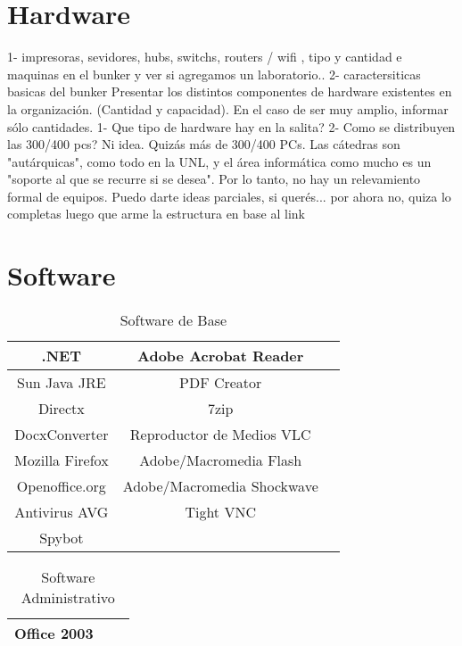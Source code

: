 \documentclass[10pt,a4paper,final]{article}
\begin{document}
\section{Hardware}
1- impresoras, sevidores, hubs, switchs, routers / wifi , tipo y cantidad e maquinas en el bunker y ver si agregamos un laboratorio..
2- caractersiticas basicas del bunker
Presentar los distintos componentes de hardware existentes en la organización. (Cantidad y capacidad).
En el caso de ser muy amplio, informar sólo cantidades.
1- Que tipo de hardware hay en la salita?
2- Como se distribuyen las 300/400 pcs?
Ni idea. Quizás más de 300/400 PCs. Las cátedras son "autárquicas", como todo en la UNL, y el área informática como mucho es un "soporte al que se recurre si se desea". Por lo tanto, no hay un relevamiento formal de equipos.
Puedo darte ideas parciales, si querés...
por ahora no, quiza lo completas luego que arme la estructura en base al link

\section{Software}

\begin{table}
\caption{Software de Base}
\begin{center}\begin{tabular}{ccc}
\hline .NET & Adobe Acrobat Reader\\
\hline Sun Java JRE & PDF Creator\\
\hline Directx & 7zip\\
\hline DocxConverter & Reproductor de Medios VLC\\
\hline Mozilla Firefox & Adobe/Macromedia Flash\\
\hline Openoffice.org & Adobe/Macromedia Shockwave\\
\hline Antivirus AVG & Tight VNC\\
\hline Spybot & \\
\hline
\end{tabular}\end{center}
\label{tablaerrores}
\end{table}

\begin{table}
\caption{Software Administrativo}
\begin{center}\begin{tabular}{ccc}
\hline Office 2003 \\
\hline
\end{tabular}\end{center}
\end{table}
\end{document}
